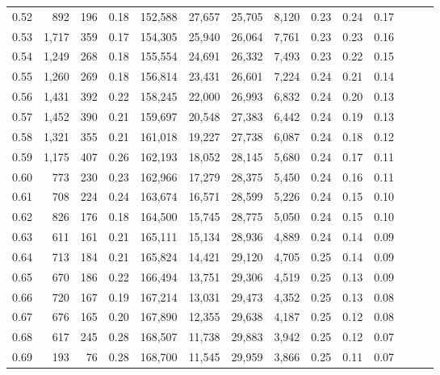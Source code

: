 \begin{tabular}{rrrrrrrrrrrrrr}
0.52 &     892 &    196 &  0.18 &  152,588 &   27,657 &  25,705 &   8,120 &  0.23 &  0.24 &      0.17 \\
0.53 &   1,717 &    359 &  0.17 &  154,305 &   25,940 &  26,064 &   7,761 &  0.23 &  0.23 &      0.16 \\
0.54 &   1,249 &    268 &  0.18 &  155,554 &   24,691 &  26,332 &   7,493 &  0.23 &  0.22 &      0.15 \\
0.55 &   1,260 &    269 &  0.18 &  156,814 &   23,431 &  26,601 &   7,224 &  0.24 &  0.21 &      0.14 \\
0.56 &   1,431 &    392 &  0.22 &  158,245 &   22,000 &  26,993 &   6,832 &  0.24 &  0.20 &      0.13 \\
0.57 &   1,452 &    390 &  0.21 &  159,697 &   20,548 &  27,383 &   6,442 &  0.24 &  0.19 &      0.13 \\
0.58 &   1,321 &    355 &  0.21 &  161,018 &   19,227 &  27,738 &   6,087 &  0.24 &  0.18 &      0.12 \\
0.59 &   1,175 &    407 &  0.26 &  162,193 &   18,052 &  28,145 &   5,680 &  0.24 &  0.17 &      0.11 \\
0.60 &     773 &    230 &  0.23 &  162,966 &   17,279 &  28,375 &   5,450 &  0.24 &  0.16 &      0.11 \\
0.61 &     708 &    224 &  0.24 &  163,674 &   16,571 &  28,599 &   5,226 &  0.24 &  0.15 &      0.10 \\
0.62 &     826 &    176 &  0.18 &  164,500 &   15,745 &  28,775 &   5,050 &  0.24 &  0.15 &      0.10 \\
0.63 &     611 &    161 &  0.21 &  165,111 &   15,134 &  28,936 &   4,889 &  0.24 &  0.14 &      0.09 \\
0.64 &     713 &    184 &  0.21 &  165,824 &   14,421 &  29,120 &   4,705 &  0.25 &  0.14 &      0.09 \\
0.65 &     670 &    186 &  0.22 &  166,494 &   13,751 &  29,306 &   4,519 &  0.25 &  0.13 &      0.09 \\
0.66 &     720 &    167 &  0.19 &  167,214 &   13,031 &  29,473 &   4,352 &  0.25 &  0.13 &      0.08 \\
0.67 &     676 &    165 &  0.20 &  167,890 &   12,355 &  29,638 &   4,187 &  0.25 &  0.12 &      0.08 \\
0.68 &     617 &    245 &  0.28 &  168,507 &   11,738 &  29,883 &   3,942 &  0.25 &  0.12 &      0.07 \\
0.69 &     193 &     76 &  0.28 &  168,700 &   11,545 &  29,959 &   3,866 &  0.25 &  0.11 &      0.07 \\

\end{tabular}
